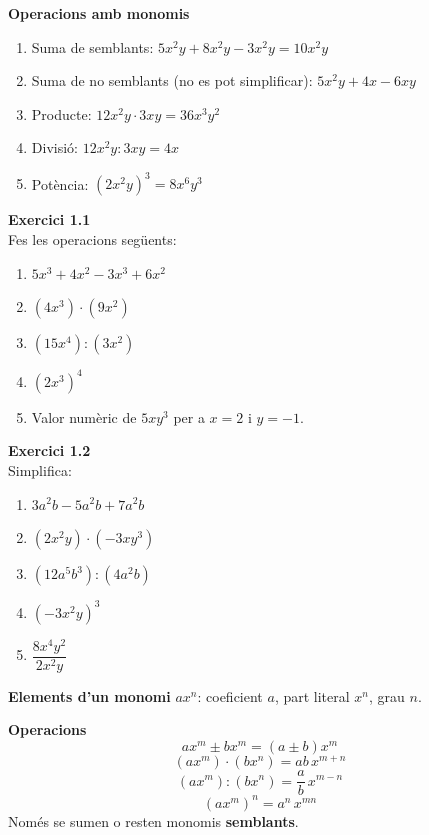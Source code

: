 \documentclass[12pt]{article}
\begin{document}
\begin{exemple}
\textbf{Operacions amb monomis}
\begin{enumerate}[label=\alph*)]
    \item Suma de semblants: $5x^2 y + 8x^2 y - 3x^2 y = 10 x^2 y$
    \item Suma de no semblants (no es pot simplificar): $5x^2 y + 4x - 6xy$
    \item Producte: $12x^2 y \cdot 3xy = 36 x^3 y^2$
    \item Divisió: $12x^2 y : 3xy = 4x$
    \item Potència: $(2x^2 y)^3 = 8 x^6 y^3$
\end{enumerate}
\end{exemple}

\begin{exercici}
\textbf{Exercici 1.1}\\
Fes les operacions següents:
\begin{enumerate}[label=\alph*)]
    \item $5x^3 + 4x^2 - 3x^3 + 6x^2$
    \item $(4x^3) \cdot (9x^2)$
    \item $(15x^4) : (3x^2)$
    \item $(2x^3)^4$
    \item Valor numèric de $5xy^3$ per a $x=2$ i $y=-1$.
\end{enumerate}
\end{exercici}

\begin{exercici}
\textbf{Exercici 1.2}\\
Simplifica:
\begin{enumerate}[label=\alph*)]
    \item $3a^2 b - 5a^2 b + 7a^2 b$
    \item $(2x^2 y) \cdot (-3xy^3)$
    \item $(12 a^5 b^3) : (4a^2 b)$
    \item $(-3x^2 y)^3$
    \item $\dfrac{8x^4 y^2}{2x^2 y}$
\end{enumerate}
\end{exercici}

\begin{resum}[title=Resum 1: Monomis]
\textbf{Elements d'un monomi} $a x^n$: coeficient $a$, part literal $x^n$, grau $n$.

\textbf{Operacions}
\[
a x^m \pm b x^m = (a \pm b) x^m
\]
\[
(a x^m) \cdot (b x^n) = a b \, x^{m+n}
\]
\[
(a x^m) : (b x^n) = \dfrac{a}{b} \, x^{m-n}
\]
\[
(a x^m)^n = a^n \, x^{m n}
\]
Només se sumen o resten monomis \textbf{semblants}.
\end{resum}
\end{document}
